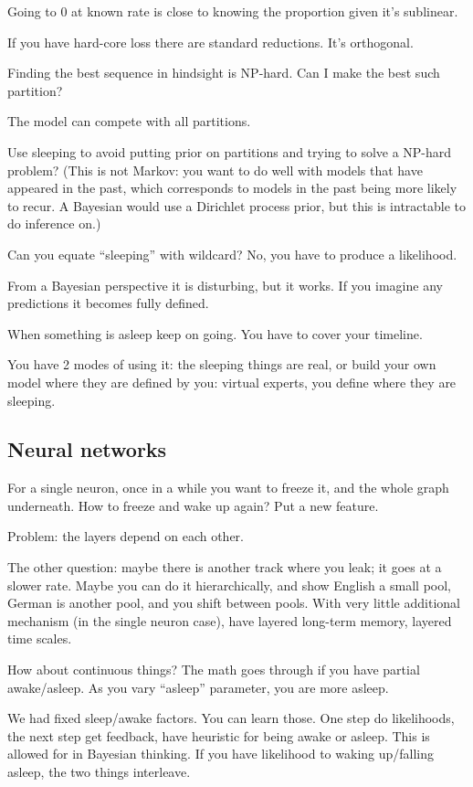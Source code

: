 Going to 0 at known rate is close to knowing the proportion given it's sublinear. 

If you have hard-core loss there are standard reductions. It's orthogonal.

Finding the best sequence in hindsight is NP-hard. %
Can I make the best such partition?

The model can compete with all partitions.

Use sleeping to avoid putting prior on partitions and trying to solve a NP-hard problem? (This is not Markov: you want to do well with models that have appeared in the past, which corresponds to models in the past being more likely to recur. A Bayesian would use a Dirichlet process prior, but this is intractable to do inference on.)

Can you equate ``sleeping'' with wildcard? No, you have to produce a likelihood.


From a Bayesian perspective it is disturbing, but it works. If you imagine any predictions it becomes fully defined. 


When something is asleep keep on going. You have to cover your timeline.

You have 2 modes of using it: the sleeping things are real, or build your own model where they are defined by you: virtual experts, you define where they are sleeping.


\subsection{Neural networks}

For a single neuron, once in a while you want to freeze it, and the whole graph underneath. How to freeze and wake up again? Put a new feature.

Problem: the layers depend on each other.

The other question: maybe there is another track where you leak; it goes at a slower rate. Maybe you can do it hierarchically, and show English a small pool, German is another pool, and you shift between pools. With very little additional mechanism (in the single neuron case), have layered long-term memory, layered time scales.


How about continuous things? The math goes through if you have partial awake/asleep. As you vary ``asleep'' parameter, you are more asleep.


We had fixed sleep/awake factors. You can learn those. One step do likelihoods, the next step get feedback, have heuristic for being awake or asleep.
This is allowed for in Bayesian thinking. If you have likelihood to waking up/falling asleep, the two things interleave. %